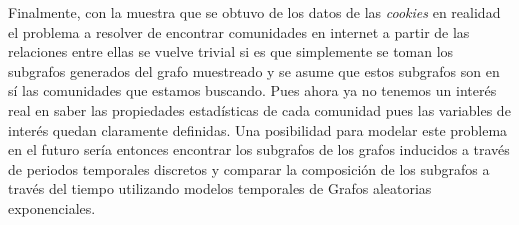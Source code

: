 Finalmente, con la muestra que se obtuvo de los datos de las \textit{cookies} en realidad el problema a resolver de encontrar comunidades en internet a partir de las relaciones entre ellas se vuelve trivial si es que simplemente se toman los subgrafos generados del grafo muestreado y se asume que estos subgrafos son en sí las comunidades que estamos buscando. Pues ahora ya no tenemos un interés real en saber las propiedades estadísticas de cada comunidad pues las variables de interés quedan claramente definidas. Una posibilidad para modelar este problema en el futuro sería entonces encontrar los subgrafos de los grafos inducidos a través de periodos temporales discretos y comparar la composición de los subgrafos a través del tiempo utilizando modelos temporales de Grafos aleatorias exponenciales.
 
